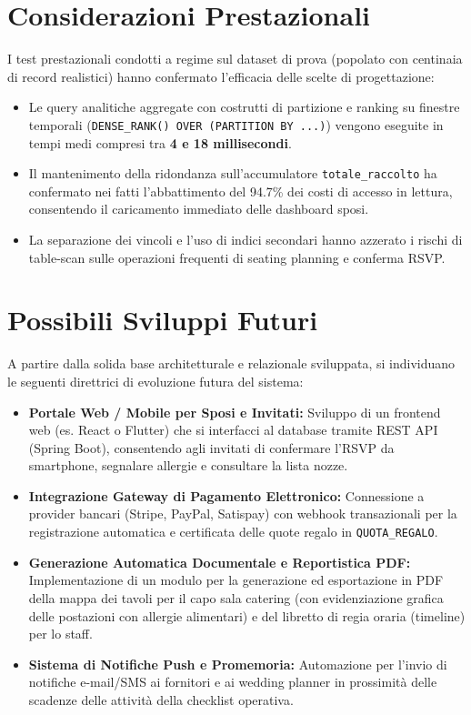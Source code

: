 \section{Considerazioni Prestazionali}
I test prestazionali condotti a regime sul dataset di prova (popolato con centinaia di record realistici) hanno confermato l'efficacia delle scelte di progettazione:
\begin{itemize}[noitemsep]
    \item Le query analitiche aggregate con costrutti di partizione e ranking su finestre temporali (\texttt{DENSE\_RANK() OVER (PARTITION BY ...)}) vengono eseguite in tempi medi compresi tra \textbf{4 e 18 millisecondi}.
    \item Il mantenimento della ridondanza sull'accumulatore \texttt{totale\_raccolto} ha confermato nei fatti l'abbattimento del 94.7\% dei costi di accesso in lettura, consentendo il caricamento immediato delle dashboard sposi.
    \item La separazione dei vincoli e l'uso di indici secondari hanno azzerato i rischi di table-scan sulle operazioni frequenti di seating planning e conferma RSVP.
\end{itemize}

\section{Possibili Sviluppi Futuri}
A partire dalla solida base architetturale e relazionale sviluppata, si individuano le seguenti direttrici di evoluzione futura del sistema:
\begin{itemize}
    \item \textbf{Portale Web / Mobile per Sposi e Invitati:} Sviluppo di un frontend web (es. React o Flutter) che si interfacci al database tramite REST API (Spring Boot), consentendo agli invitati di confermare l'RSVP da smartphone, segnalare allergie e consultare la lista nozze.
    \item \textbf{Integrazione Gateway di Pagamento Elettronico:} Connessione a provider bancari (Stripe, PayPal, Satispay) con webhook transazionali per la registrazione automatica e certificata delle quote regalo in \texttt{QUOTA\_REGALO}.
    \item \textbf{Generazione Automatica Documentale e Reportistica PDF:} Implementazione di un modulo per la generazione ed esportazione in PDF della mappa dei tavoli per il capo sala catering (con evidenziazione grafica delle postazioni con allergie alimentari) e del libretto di regia oraria (timeline) per lo staff.
    \item \textbf{Sistema di Notifiche Push e Promemoria:} Automazione per l'invio di notifiche e-mail/SMS ai fornitori e ai wedding planner in prossimità delle scadenze delle attività della checklist operativa.
\end{itemize}
